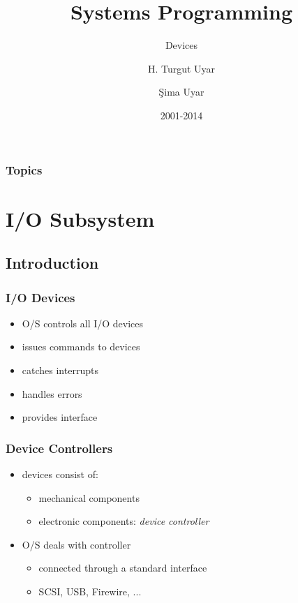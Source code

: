 \documentclass[dvipsnames]{beamer}
\title{Systems Programming}
\subtitle{Devices}
\author{H. Turgut Uyar \and Şima Uyar}
\date{2001-2014}
\begin{document}
\begin{frame}
  \titlepage
\end{frame}

\begin{frame}
  \frametitle{Topics}
  \tableofcontents
\end{frame}

\section{I/O Subsystem}

\subsection{Introduction}

\begin{frame}
  \frametitle{I/O Devices}

  \begin{itemize}
    \item O/S controls all I/O devices

    \medskip
    \item issues commands to devices
    \item catches interrupts
    \item handles errors

    \medskip
    \item provides interface
  \end{itemize}
\end{frame}

\begin{frame}
  \frametitle{Device Controllers}

  \begin{itemize}
    \item devices consist of:
    \begin{itemize}
      \item mechanical components
      \item electronic components: \emph{device controller}
    \end{itemize}

    \medskip
    \item O/S deals with controller
    \begin{itemize}
      \item connected through a standard interface
      \item SCSI, USB, Firewire, ...
    \end{itemize}
  \end{itemize}
\end{frame}
\end{document}
